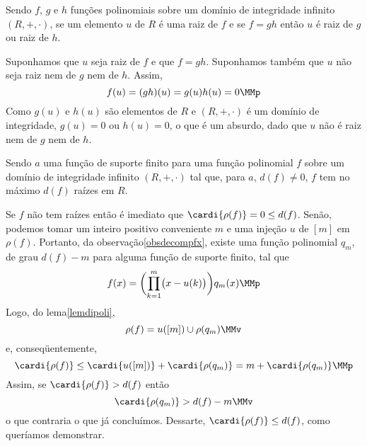 \begin{Funções polinomiais}
\begin{Lem}\label{lemdipoli}
  Sendo $f$, $g$ e $h$ funções polinomiais sobre um domínio de
  integridade infinito $(R,+,\cdot)$, se um elemento $u$ de $R$ é uma
  raiz de $f$ e se $f=gh$ então $u$ é raiz de $g$ ou raiz de $h$.
\end{Lem}

\begin{dem}
  Suponhamos que $u$ seja raiz de $f$ e que $f=gh$. Suponhamos também
  que $u$ não seja raiz nem de $g$ nem de $h$. Assim,
  \begin{equation*}
    f(u) = (gh)(u) = g(u)h(u) = 0\MMp
  \end{equation*}
  Como $g(u)$ e $h(u)$ são elementos de $R$ e $(R,+,\cdot)$ é um domínio
  de integridade, $g(u)=0$ ou $h(u)=0$, o que é um absurdo, dado que $u$
  não é raiz nem de $g$ nem de $h$.
\end{dem}

\begin{Lem}\label{lemmaxdf}
  Sendo $a$ uma função de suporte finito para uma função polinomial $f$
  sobre um domínio de integridade
  infinito $(R,+,\cdot)$ tal que, para $a$,
  $d(f)\neq 0$, $f$ tem no máximo $d(f)$ raízes em $R$.
\end{Lem}

\begin{dem}
  Se $f$ não tem raízes então é imediato que
  $\cardi{\rho(f)}=0\leq d(f)$.
  Senão, podemos tomar um inteiro positivo conveniente $m$ e
  uma injeção $u$ de $[m]$ em $\rho(f)$. Portanto, da
  observação\xspace\ref{obsdecompfx}, existe uma função polinomial
  $q_m$,
  de grau $d(f)-m$ para alguma função de suporte finito, tal que
  \begin{equation*}
    f(x) = \biggl(\prod_{k=1}^m \bigl(x-u(k)\bigr)\biggr)q_m(x)\MMp
  \end{equation*}
  Logo, do lema\xspace\ref{lemdipoli},
  \begin{equation*}
    \rho(f) = u([m])\cup \rho(q_m)\MMv
  \end{equation*}
  e, conseqüentemente,
  \begin{equation*}
    \cardi{\rho(f)} \leq \cardi{u([m])} + \cardi{\rho(q_m)}
     = m + \cardi{\rho(q_m)}\MMp
  \end{equation*}
  Assim, se $\cardi{\rho(f)}>d(f)$ então
  \begin{equation*}
    \cardi{\rho(q_m)} > d(f)-m\MMv
  \end{equation*}
  o que contraria o que já concluímos. Dessarte,
  $\cardi{\rho(f)}\leq d(f)$, como queríamos demonstrar.
\end{dem}


\end{Funções polinomiais}
